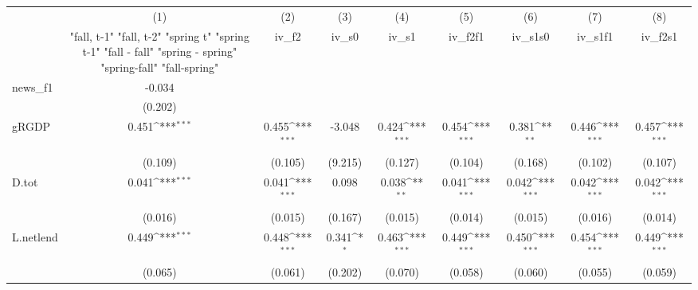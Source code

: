 {
\def\sym#1{\ifmmode^{#1}\else\(^{#1}\)\fi}
\begin{tabular}{l*{8}{c}}
\toprule
            &\multicolumn{1}{c}{(1)}&\multicolumn{1}{c}{(2)}&\multicolumn{1}{c}{(3)}&\multicolumn{1}{c}{(4)}&\multicolumn{1}{c}{(5)}&\multicolumn{1}{c}{(6)}&\multicolumn{1}{c}{(7)}&\multicolumn{1}{c}{(8)}\\
            &\multicolumn{1}{c}{  "fall, t-1" "fall, t-2" "spring t" "spring t-1"  "fall - fall" "spring - spring" "spring-fall" "fall-spring" }&\multicolumn{1}{c}{iv\_f2}&\multicolumn{1}{c}{iv\_s0}&\multicolumn{1}{c}{iv\_s1}&\multicolumn{1}{c}{iv\_f2f1}&\multicolumn{1}{c}{iv\_s1s0}&\multicolumn{1}{c}{iv\_s1f1}&\multicolumn{1}{c}{iv\_f2s1}\\
\midrule
news\_f1     &      -0.034         &                     &                     &                     &                     &                     &                     &                     \\
            &     (0.202)         &                     &                     &                     &                     &                     &                     &                     \\
\addlinespace
gRGDP       &       0.451\sym{***}&       0.455\sym{***}&      -3.048         &       0.424\sym{***}&       0.454\sym{***}&       0.381\sym{**} &       0.446\sym{***}&       0.457\sym{***}\\
            &     (0.109)         &     (0.105)         &     (9.215)         &     (0.127)         &     (0.104)         &     (0.168)         &     (0.102)         &     (0.107)         \\
\addlinespace
D.tot       &       0.041\sym{***}&       0.041\sym{***}&       0.098         &       0.038\sym{**} &       0.041\sym{***}&       0.042\sym{***}&       0.042\sym{***}&       0.042\sym{***}\\
            &     (0.016)         &     (0.015)         &     (0.167)         &     (0.015)         &     (0.014)         &     (0.015)         &     (0.016)         &     (0.014)         \\
\addlinespace
L.netlend   &       0.449\sym{***}&       0.448\sym{***}&       0.341\sym{*}  &       0.463\sym{***}&       0.449\sym{***}&       0.450\sym{***}&       0.454\sym{***}&       0.449\sym{***}\\
            &     (0.065)         &     (0.061)         &     (0.202)         &     (0.070)         &     (0.058)         &     (0.060)         &     (0.055)         &     (0.059)         \\

\end{tabular}}

